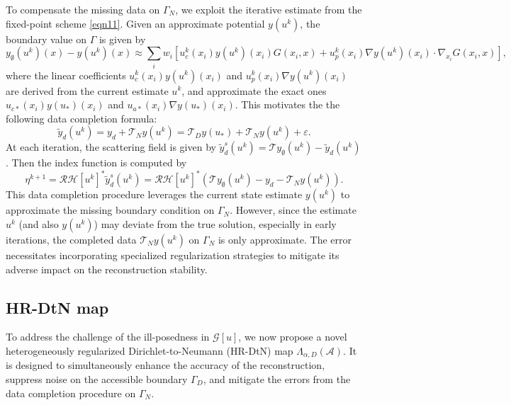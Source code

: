 \documentclass[onefignum,onetabnum]{siamart190516}
\numberwithin{equation}{section}
\begin{document}
To compensate the missing data on $\Gamma_N$, we exploit the iterative estimate from the fixed-point scheme \eqref{eqn11}.
Given an approximate potential $y(u^{k})$, the boundary value on $\Gamma$ is given by
\begin{equation*}
y_{\emptyset}(u^{k})(x) - y(u^{k})(x) \approx \sum_{i} w_{i} \left[ u^{k}_{c}(x_{i}) y(u^{k})(x_{i}) G(x_{i},x) + u^{k}_{p}(x_{i}) \nabla y(u^{k})(x_{i}) \cdot \nabla_{x_{i}} G(x_{i},x) \right],
\end{equation*}
where the linear coefficients $u^{k}_{c}(x_{i}) y(u^{k})(x_{i})$ and $u^{k}_{p}(x_{i}) \nabla y(u^{k})(x_{i})$ are derived from the current estimate $u^{k}$, and approximate the exact ones $u_{c*}(x_{i}) y(u_{*})(x_{i})$ and $u_{a*}(x_{i}) \nabla y(u_{*})(x_{i})$.
This motivates the the following data completion formula:
\begin{equation}\label{eqn31}
\tilde{y}_{d}(u^{k}) = y_{d} + \mathcal{T}_N y(u^{k})=\mathcal{T}_{D}y(u_{*})+ \mathcal{T}_N y(u^{k})+\varepsilon.
\end{equation}
At each iteration, the scattering field is given by $\tilde{y}^{s}_{d}(u^{k})=\mathcal{T}y_{\emptyset}(u^{k})-\tilde{y}_{d}(u^{k})$.
Then the index function is computed by
\begin{equation*}
\eta^{k+1}=\mathcal{R}\mathcal{H}[u^{k}]^{*}\tilde{y}^{s}_{d}(u^{k})=\mathcal{R}\mathcal{H}[u^{k}]^{*}\left(\mathcal{T}y_{\emptyset}(u^{k})-y_{d} - \mathcal{T}_N y(u^{k})\right).
\end{equation*}
This data completion procedure leverages the current state estimate $y(u^k)$ to approximate the missing boundary condition on $\Gamma_N$.
However, since the estimate $u^k$ (and also $y(u^k)$) may deviate from the true solution, especially in early iterations, the completed data $\mathcal{T}_N y(u^k)$ on $\Gamma_N$ is only approximate.
The error necessitates incorporating specialized regularization strategies to mitigate its adverse impact on the reconstruction stability.

\subsection{HR-DtN map}\label{subsec:hrdm}
To address the challenge of the ill-posedness in $\mathcal{G}[u]$, we now propose a novel heterogeneously regularized Dirichlet-to-Neumann (HR-DtN) map $\Lambda_{\alpha,D}(\mathcal{A})$.
It is designed to simultaneously enhance the accuracy of the reconstruction, suppress noise on the accessible boundary $\Gamma_D$, and mitigate the errors from the data completion procedure on $\Gamma_N$.
\end{document}
